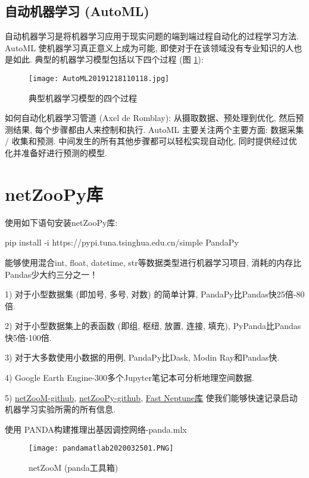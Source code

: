 \subsection{自动机器学习 (AutoML)}
自动机器学习是将机器学习应用于现实问题的端到端过程自动化的过程学习方法.
AutoML 使机器学习真正意义上成为可能, 即使对于在该领域没有专业知识的人也是如此.
典型的机器学习模型包括以下四个过程 (图 \ref{AutoML2019fig2702}):
\begin{figure}[H]
    \centering
    \texttt{[image: AutoML20191218110118.jpg]}
    \caption{典型机器学习模型的四个过程}
    \label{AutoML2019fig2702}
\end{figure}
如何自动化机器学习管道 (Axel de Romblay):
从摄取数据、预处理到优化, 然后预测结果, 每个步骤都由人来控制和执行.
AutoML 主要关注两个主要方面: 数据采集 / 收集和预测.
中间发生的所有其他步骤都可以轻松实现自动化, 同时提供经过优化并准备好进行预测的模型.
\section{netZooPy库}
使用如下语句安装netZooPy库:

pip install -i https://pypi.tuna.tsinghua.edu.cn/simple PandaPy

能够使用混合int, float, datetime, str等数据类型进行机器学习项目, 消耗的内存比Pandas少大约三分之一！

1) 对于小型数据集 (即加号, 多号, 对数) 的简单计算, PandaPy比Pandas快25倍-80倍.

2) 对于小型数据集上的表函数 (即组, 枢纽, 放置, 连接, 填充), PyPanda比Pandas快5倍-100倍.

3) 对于大多数使用小数据的用例, PandaPy比Dask, Modin Ray和Pandas快.

4) Google Earth Engine-300多个Jupyter笔记本可分析地理空间数据.

5) \href{https://github.com/netZoo/netZooM}{netZooM-github}, \href{https://github.com/netZoo/netZooPy}{netZooPy-github},
\href{https://github.com/DanyWind/fast_neptune}{Fast Neptune库} 使我们能够快速记录启动机器学习实验所需的所有信息.
\begin{exampleT}
使用 PANDA构建推理出基因调控网络-panda.mlx
\begin{figure}[H]
    \centering
    \texttt{[image: pandamatlab2020032501.PNG]}
    \caption{netZooM (panda工具箱)}
    \label{pandamatlab2020032501}
    \vspace{-0.5cm}
\end{figure}
\end{exampleT}


